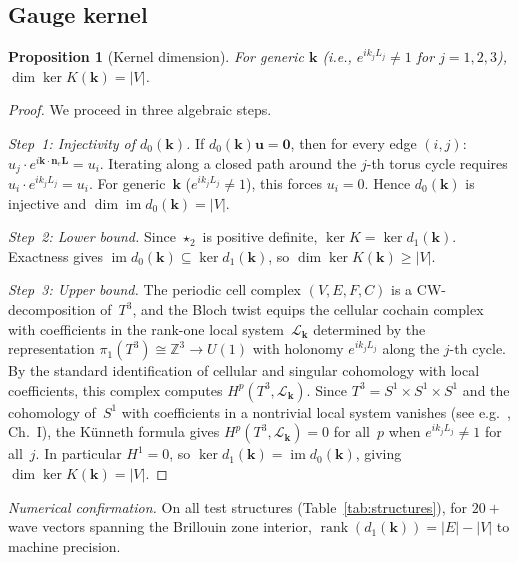 \documentclass[preprint,12pt]{elsarticle}
\newtheorem{proposition}{Proposition}
\begin{document}
\subsection{Gauge kernel}

\begin{proposition}[Kernel dimension]\label{prop:kernel}
For generic $\mathbf{k}$ (i.e., $e^{ik_j L_j} \neq 1$ for $j = 1,2,3$), $\dim\ker K(\mathbf{k}) = |V|$.
\end{proposition}

\begin{proof}
We proceed in three algebraic steps.

\emph{Step~1: Injectivity of $d_0(\mathbf{k})$.} If $d_0(\mathbf{k})\mathbf{u} = \mathbf{0}$, then for every edge $(i,j)$: $u_j \cdot e^{i\mathbf{k}\cdot\mathbf{n}_e\mathbf{L}} = u_i$. Iterating along a closed path around the $j$-th torus cycle requires $u_i \cdot e^{ik_j L_j} = u_i$. For generic~$\mathbf{k}$ ($e^{ik_j L_j} \neq 1$), this forces $u_i = 0$. Hence $d_0(\mathbf{k})$ is injective and $\dim\operatorname{im} d_0(\mathbf{k}) = |V|$.

\emph{Step~2: Lower bound.} Since $\star_2$ is positive definite, $\ker K = \ker d_1(\mathbf{k})$. Exactness gives $\operatorname{im} d_0(\mathbf{k}) \subseteq \ker d_1(\mathbf{k})$, so $\dim\ker K(\mathbf{k}) \geq |V|$.

\emph{Step~3: Upper bound.} The periodic cell complex $(V, E, F, C)$ is a CW-decomposition of~$T^3$, and the Bloch twist equips the cellular cochain complex with coefficients in the rank-one local system~$\mathcal{L}_\mathbf{k}$ determined by the representation $\pi_1(T^3) \cong \mathbb{Z}^3 \to U(1)$ with holonomy $e^{ik_j L_j}$ along the $j$-th cycle. By the standard identification of cellular and singular cohomology with local coefficients, this complex computes $H^p(T^3, \mathcal{L}_\mathbf{k})$. Since $T^3 = S^1 \times S^1 \times S^1$ and the cohomology of~$S^1$ with coefficients in a nontrivial local system vanishes (see e.g.\ \cite{Bott1982}, Ch.~I), the K\"unneth formula gives $H^p(T^3, \mathcal{L}_\mathbf{k}) = 0$ for all~$p$ when $e^{ik_j L_j} \neq 1$ for all~$j$. In particular $H^1 = 0$, so $\ker d_1(\mathbf{k}) = \operatorname{im} d_0(\mathbf{k})$, giving $\dim\ker K(\mathbf{k}) = |V|$.
\end{proof}

\emph{Numerical confirmation.} On all test structures (Table~\ref{tab:structures}), for $20{+}$ wave vectors spanning the Brillouin zone interior, $\operatorname{rank}(d_1(\mathbf{k})) = |E| - |V|$ to machine precision.
\end{document}
